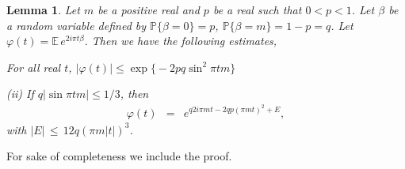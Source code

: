 \documentclass[11pt,draft,reqno]{amsart}
\newtheorem{lemma}[theorem]{Lemma}
\theoremstyle{definition}
\theoremstyle{remarks}
\numberwithin{equation}{section}
\def \b{{\beta}}
\def \p{{\varphi}}
\begin{document}
  \begin{lemma}\label{lfp1} Let $m  $ be a positive real and $p$ be a real such that $0<p<1$. Let $\b$ be a random variable defined by ${\mathbb P}\{ \b=0\}= p$, $
{\mathbb P}\{
\b=m\}= 1-p=q$.  Let $\p(t) ={\mathbb E\,} e^{2i\pi t \b}$. Then
 we have the following estimates,

\smallskip
\hspace*{1.2mm}{\rm (i)} For all real $t$,
 $|{\varphi}(t)|\le \exp\big\{- 2pq\sin^2\pi t m\big\} $

\smallskip
{\rm (ii)} If $q|\sin \pi t m|\le 1/3$, then
 \begin{eqnarray*}  \p(t)&=& e^{  q      2i\pi mt   - 2qp (  \pi mt)^2 +E}
 , 
\end{eqnarray*}
with  
$|E|\, \le \,   12 q (\pi m|t|)^3$.
    \end{lemma}
      For   sake of completeness we include the proof.
\end{document}
